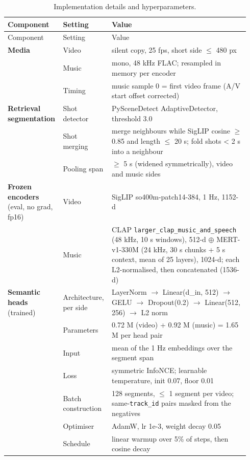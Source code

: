 \begingroup\footnotesize
\begin{longtable}{@{}p{0.2\linewidth}p{0.18\linewidth}p{0.56\linewidth}@{}}
\caption{Implementation details and hyperparameters.}\label{tab:hyperparameters}\\
\toprule Component & Setting & Value\\ \midrule\endfirsthead
\toprule Component & Setting & Value\\ \midrule\endhead
\bottomrule\endlastfoot
\textbf{Media} & Video & silent copy, 25 fps, short side $\le$ 480 px\\
 & Music & mono, 48 kHz FLAC; resampled in memory per encoder\\
 & Timing & music sample 0 = first video frame (A/V start offset corrected)\\
\midrule
\textbf{Retrieval segmentation} & Shot detector & PySceneDetect AdaptiveDetector, threshold 3.0\\
 & Shot merging & merge neighbours while SigLIP cosine $\ge$ 0.85 and length $\le$ 20 s; fold shots < 2 s into a neighbour\\
 & Pooling span & $\ge$ 5 s (widened symmetrically), video and music sides\\
\midrule
\textbf{Frozen encoders} (eval, no grad, fp16) & Video & SigLIP so400m-patch14-384, 1 Hz, 1152-d\\
 & Music & CLAP \texttt{larger\_clap\_music\_and\_speech} (48 kHz, 10 s windows), 512-d $\oplus$ MERT-v1-330M (24 kHz, 30 s chunks + 5 s context, mean of 25 layers), 1024-d; each L2-normalised, then concatenated (1536-d)\\
\midrule
\textbf{Semantic heads} (trained) & Architecture, per side & LayerNorm $\rightarrow$ Linear(d\_in, 512) $\rightarrow$ GELU $\rightarrow$ Dropout(0.2) $\rightarrow$ Linear(512, 256) $\rightarrow$ L2 norm\\
 & Parameters & 0.72 M (video) + 0.92 M (music) = 1.65 M per head pair\\
 & Input & mean of the 1 Hz embeddings over the segment span\\
 & Loss & symmetric InfoNCE; learnable temperature, init 0.07, floor 0.01\\
 & Batch construction & 128 segments, $\le$ 1 segment per video; same-\texttt{track\_id} pairs masked from the negatives\\
 & Optimiser & AdamW, lr 1e-3, weight decay 0.05\\
 & Schedule & linear warmup over 5\% of steps, then cosine decay\\

\end{longtable}
